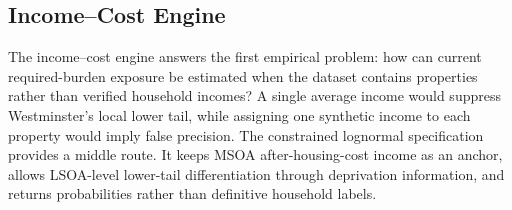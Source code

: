 \subsection{Income--Cost Engine}

The income--cost engine answers the first empirical problem: how can current required-burden exposure be estimated when the dataset contains properties rather than verified household incomes? A single average income would suppress Westminster's local lower tail, while assigning one synthetic income to each property would imply false precision. The constrained lognormal specification provides a middle route. It keeps MSOA after-housing-cost income as an anchor, allows LSOA-level lower-tail differentiation through deprivation information, and returns probabilities rather than definitive household labels.

